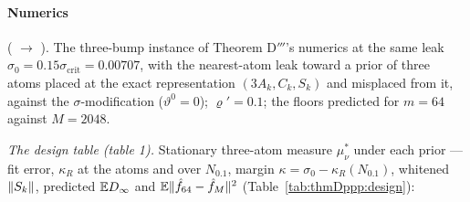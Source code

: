 \paragraph{Numerics} ( $\to$ ). The three-bump
instance of Theorem D$'''$'s numerics at the same leak $\sigma_0 = 0.15\sigma_{\mathrm{crit}} = 0.00707$, with the
nearest-atom leak toward a prior of three atoms placed at the exact representation $(3A_k, C_k, S_k)$ and misplaced
from it, against the $\sigma$-modification ($\vartheta^0 = 0$); $\varrho' = 0.1$; the floors predicted for $m = 64$
against $M = 2048$.

\smallskip
\noindent\emph{The design table (table 1).} Stationary three-atom measure $\mu^*_\nu$ under each prior --- fit
error, $\kappa_R$ at the atoms and over $N_{0.1}$, margin $\kappa = \sigma_0 - \kappa_R(N_{0.1})$, whitened
$\lVert S_k\rVert$, predicted $\mathbb{E} D_\infty$ and $\mathbb{E}\lVert \hat f_{64} - \hat f_M\rVert^2$ (Table~\ref{tab:thmDppp:design}):

